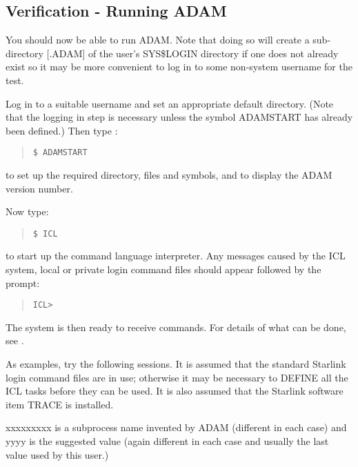 \subsection{Verification - Running ADAM}
You should now be able to run ADAM.
Note that doing so will create a sub-directory [.ADAM] of the user's
SYS\$LOGIN directory if one does not already exist so it may be more
convenient to log in to some non-system username for the test.

Log in to a suitable username and set an appropriate default directory.
(Note that the logging in step is necessary unless the symbol ADAM\-START
has already been defined.)
Then type :
\small \begin{quote}
\begin{verbatim}
$ ADAMSTART
\end{verbatim}
\end{quote} \normalsize
to set up the required directory, files and symbols, and to display the ADAM
version number.

Now type:
\small \begin{quote}
\begin{verbatim}
$ ICL
\end{verbatim}
\end{quote} \normalsize
to start up the command language interpreter.
Any messages caused by the ICL system, local or private login command files
should appear followed by the prompt:
\small \begin{quote}
\begin{verbatim}
ICL>
\end{verbatim}
\end{quote} \normalsize
The system is then ready to receive commands. For details of what can be
done, see \cite{icl}.

As examples, try the following sessions. It is assumed that the standard
Starlink login command files are in use; otherwise it may be necessary to
DEFINE all the ICL tasks before they can be used.
It is also assumed that the Starlink software item TRACE is installed.

xxxxxxxxx is a subprocess name invented by ADAM (different in each case) and
yyyy is the suggested value (again different in each case and usually the last
value used by this user.)

